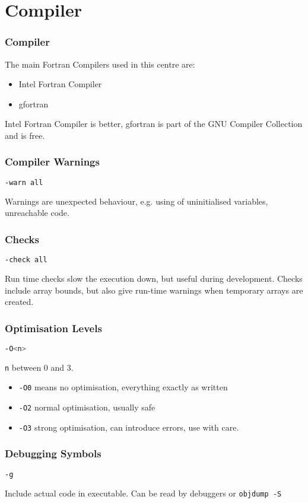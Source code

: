 \section{Compiler}
\begin{frame}
    \frametitle{Compiler}
    The main Fortran Compilers used in this centre are:
    \begin{itemize}
        \item Intel Fortran Compiler
        \item gfortran
    \end{itemize}
    Intel Fortran Compiler is better, gfortran is part of the GNU Compiler Collection and is free.
\end{frame}
\begin{frame}[fragile]
    \frametitle{Compiler Warnings}
    \begin{lstlisting}[language=bash]
    -warn all
    \end{lstlisting}
    Warnings are unexpected behaviour, e.g. using of uninitialised variables, unreachable code.
\end{frame}
\begin{frame}[fragile]
    \frametitle{Checks}
    \begin{lstlisting}[language=bash]
    -check all
    \end{lstlisting}
    Run time checks slow the execution down, but useful during development.
    Checks include array bounds, but also give run-time warnings when temporary arrays are created.
\end{frame}
\begin{frame}[fragile]
    \frametitle{Optimisation Levels}
    \begin{lstlisting}[language=bash]
    -O<n>
    \end{lstlisting}
    \texttt{n} between 0 and 3.
    \begin{itemize}
    \item \texttt{-O0} means no optimisation, everything exactly as written
    \item \texttt{-O2} normal optimisation, usually safe
    \item \texttt{-O3} strong optimisation, can introduce errors, use with care.
    \end{itemize}
\end{frame}
\begin{frame}[fragile]
    \frametitle{Debugging Symbols}
    \begin{lstlisting}[language=bash]
    -g
    \end{lstlisting}
    Include actual code in executable. Can be read by debuggers or \texttt{objdump -S}
\end{frame}
